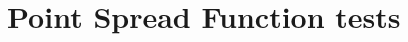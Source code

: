 \documentclass[extra,mreferee]{gji}
\begin{document}






\section{Point Spread Function tests}
\end{document}
